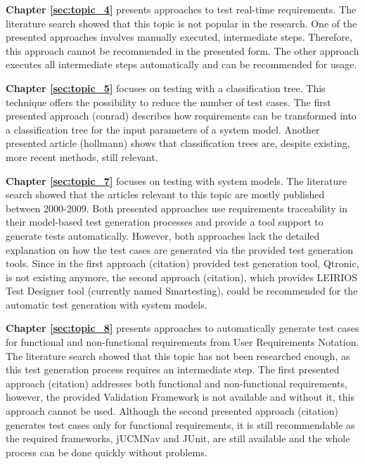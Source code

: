 \textbf{Chapter \ref{sec:topic_4}} presents approaches to test real-time requirements. The literature search showed that this topic is not popular in the research. One of the presented approaches \cite{Siegl2010} involves manually executed, intermediate steps. Therefore, this approach cannot be recommended in the presented form. The other approach \cite{Guan2015} executes all intermediate steps automatically and can be recommended for usage.

\textbf{Chapter \ref{sec:topic_5}} focuses on testing with a classification tree. This technique offers the possibility to reduce the number of test cases. The first presented approach (conrad) describes how requirements can be transformed into a classification tree for the input parameters of a system model. Another presented article (hollmann) shows that classification trees are, despite existing, more recent methods, still relevant.

\textbf{Chapter \ref{sec:topic_7}} focuses on testing with system models. The literature search showed that the articles relevant to this topic are mostly published between 2000-2009. Both presented approaches use requirements traceability in their model-based test generation processes and provide a tool support to generate tests automatically. However, both approaches lack the detailed explanation on how the test cases are generated via the provided test generation tools. Since in the first approach (citation) provided test generation tool, Qtronic, is not existing anymore, the second approach (citation), which provides LEIRIOS Test Designer tool (currently named Smartesting), could be recommended for the automatic test generation with system models.

\textbf{Chapter \ref{sec:topic_8}} presents approaches to automatically generate test cases for functional and non-functional requirements from User Requirements Notation. The literature search showed that this topic has not been researched enough, as this test generation process requires an intermediate step. The first presented approach (citation) addresses both functional and non-functional requirements, however, the provided Validation Framework is not available and without it, this approach cannot be used. Although the second presented approach (citation) generates test cases only for functional requirements, it is still recommendable as the required frameworks, jUCMNav and JUnit, are still available and the whole process can be done quickly without problems. 

